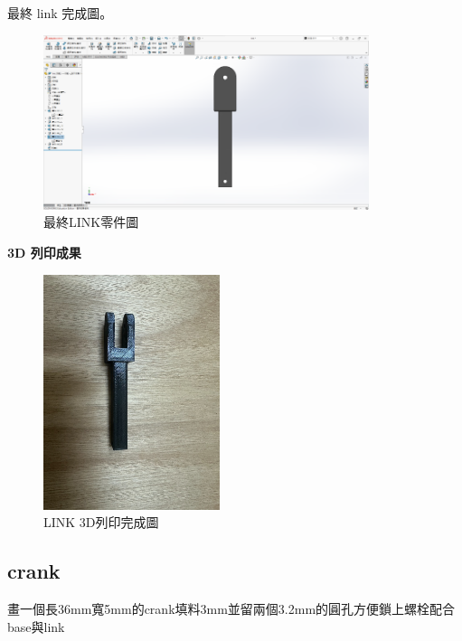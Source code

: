 \newpage

最終 link 完成圖。

\begin{figure}[htbp]
    \centering
    \includegraphics[width=0.85\textwidth]{./../images/6-1-44}
    \caption{最終LINK零件圖}
\end{figure}

\textbf{3D 列印成果}

\begin{figure}[htbp]
    \centering
    \includegraphics[width=0.46\textwidth]{./../images/6-1-23}
    \caption{LINK 3D列印完成圖}
\end{figure}

\newpage

\subsection{crank}

畫一個長36mm寬5mm的crank填料3mm並留兩個3.2mm的圓孔方便鎖上螺栓配合base與link


